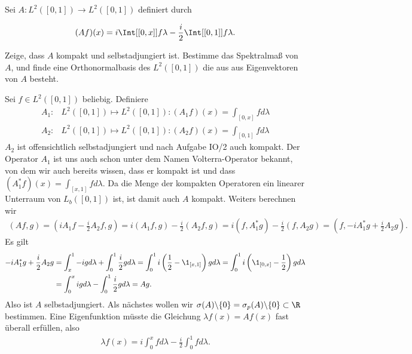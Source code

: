 \begin{exercise}[37/2]

Sei $A: L^2([0, 1]) \to L^2([0, 1])$ definiert durch

\begin{align*}
  (A f)(x)
  =
  i
  \Int[{[0, x]}]{f}{\lambda}
  - \frac{i}{2}
  \Int[{[0, 1]}]{f}{\lambda}.
\end{align*}

Zeige, dass $A$ kompakt und selbstadjungiert ist.
Bestimme das Spektralmaß von $A$, und finde eine Orthonormalbasis des $L^2([0, 1])$ die aus aus Eigenvektoren von $A$ besteht.

\end{exercise}

\begin{solution}
Sei $f \in L^2([0,1])$ beliebig. Definiere
\begin{align*}
  A_1:& L^2([0,1]) \mapsto L^2([0,1]): (A_1f)(x) = \int_{[0,x]}f d\lambda  \\
  A_2:& L^2([0,1]) \mapsto L^2([0,1]): (A_2f)(x) = \int_{[0,1]}f d\lambda
\end{align*}
$A_2$ ist offensichtlich selbstadjungiert und nach Aufgabe IO/2 auch kompakt.
Der Operator $A_1$ ist uns auch schon unter dem Namen Volterra-Operator bekannt,
von dem wir auch bereits wissen, dass er kompakt ist und dass
$(A_1^*f)(x) = \int_{[x,1]}f d\lambda$. Da die Menge der kompakten Operatoren
ein linearer Unterraum von $L_b([0,1])$ ist, ist damit auch $A$ kompakt.
Weiters berechnen wir
\begin{align*}
  (Af,g) = (iA_1f - \frac{i}{2}A_2f,g) = i(A_1f,g) - \frac{i}{2}(A_2f,g)
  = i(f,A_1^*g) - \frac{i}{2}(f,A_2g)
  = (f,-iA_1^*g + \frac{i}{2}A_2g).
\end{align*}
Es gilt
\begin{align*}
  -iA_1^*g + \frac{i}{2}A_2g &= \int_x^1 -ig d\lambda + \int_0^1\frac{i}{2}g d\lambda
  = \int_0^1i\left(\frac{1}{2} -\1_{[x,1]}\right)g d\lambda =
  \int_0^1i\left(\1_{[0,x]} -\frac{1}{2}\right)g d\lambda \\
  &= \int_0^x ig d\lambda - \int_0^1 \frac{i}{2}g d\lambda = Ag.
\end{align*}
Also ist $A$ selbstadjungiert. Als nächstes wollen wir
$\sigma(A)\backslash\{0\} = \sigma_p(A)\backslash\{0\} \subset \R$ bestimmen.
Eine Eigenfunktion müsste die Gleichung $\lambda f(x) = A f(x)$ fast überall erfüllen, also
\begin{align*}
  \lambda f(x) = i \int_0^x f d\lambda - \frac{i}{2}\int_0^1 f d\lambda.
\end{align*}

\end{solution}
